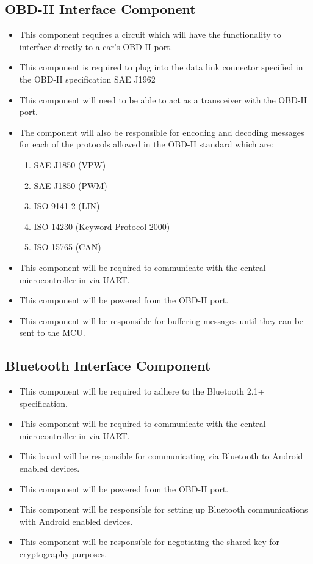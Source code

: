 \documentclass[12pt,letterpaper]{article}
\begin{document}
\subsection{OBD-II Interface Component}
\begin{itemize}
	\item This component requires a circuit which will have the functionality to interface directly to a car's OBD-II port. 
	\item This component is required to plug into the data link connector specified in the OBD-II specification SAE J1962
	\item This component will need to be able to act as a transceiver with the OBD-II port.
	\item The component will also be responsible for encoding and decoding messages for each of the protocols allowed in the OBD-II standard which are:
	\begin{enumerate}
		\item SAE J1850 (VPW)
		\item SAE J1850 (PWM)
		\item ISO 9141-2 (LIN)
		\item ISO 14230 (Keyword Protocol 2000)
		\item ISO 15765 (CAN)
	\end{enumerate}
	\item This component will be required to communicate with the central microcontroller in via UART.
	\item This component will be powered from the OBD-II port.
	\item This component will be responsible for buffering messages until they can be sent to the MCU.
\end{itemize}

\subsection{Bluetooth Interface Component}
\begin{itemize}
	\item This component will be required to adhere to the Bluetooth 2.1+ specification.
	\item This component will be required to communicate with the central microcontroller in via UART.
	\item This board will be responsible for communicating via Bluetooth to Android enabled devices.
	\item This component will be powered from the OBD-II port.
	\item This component will be responsible for setting up Bluetooth communications with Android enabled devices.
	\item This component will be responsible for negotiating the shared key for cryptography purposes.
\end{itemize}
\end{document}
